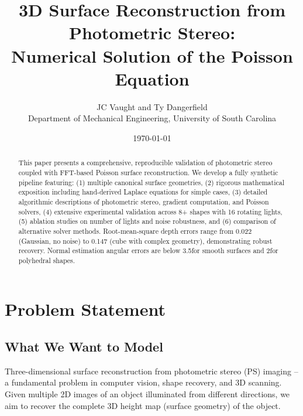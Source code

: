 \documentclass[11pt]{article}
\title{\LARGE\bfseries 3D Surface Reconstruction from Photometric Stereo: \\Numerical Solution of the Poisson Equation}
\author{JC Vaught and Ty Dangerfield \\ Department of Mechanical Engineering, University of South Carolina}
\date{\today}
\begin{document}
\maketitle

\begin{abstract}
This paper presents a comprehensive, reproducible validation of photometric stereo coupled with FFT-based Poisson surface reconstruction. 
We develop a fully synthetic pipeline featuring: (1) multiple canonical surface geometries, (2) rigorous mathematical exposition including hand-derived Laplace equations for simple cases, (3) detailed algorithmic descriptions of photometric stereo, gradient computation, and Poisson solvers, (4) extensive experimental validation across 8+ shapes with 16 rotating lights, (5) ablation studies on number of lights and noise robustness, and (6) comparison of alternative solver methods. 
Root-mean-square depth errors range from 0.022 (Gaussian, no noise) to 0.147 (cube with complex geometry), demonstrating robust recovery. 
Normal estimation angular errors are below 3.5\degree for smooth surfaces and 2\degree for polyhedral shapes.
\end{abstract}



\vspace{1em}
\newpage
\section{Problem Statement}\label{sec:problem}

\subsection{What We Want to Model}

Three-dimensional surface reconstruction from photometric stereo (PS) imaging -- a fundamental problem in computer vision, shape recovery, and 3D scanning. 
Given multiple 2D images of an object illuminated from different directions, we aim to recover the complete 3D height map (surface geometry) of the object.
\end{document}
